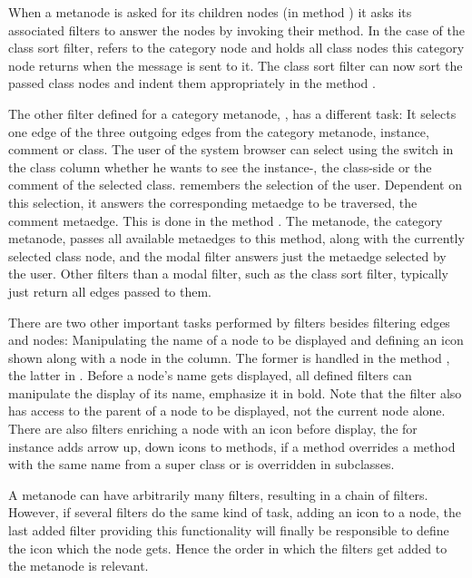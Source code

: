 \documentclass[a4paper,10pt,twoside]{book}
\begin{document}
When a metanode is asked for its children nodes (in method ) it asks its associated filters to answer the nodes by invoking their  method. In the case of the class sort filter,  refers to the category node and  holds all class nodes this category node returns when the message  is sent to it. The class sort filter can now sort the passed class nodes and indent them appropriately in the method .

The other filter defined for a category metanode, , has a different task: It selects one edge of the three outgoing edges from the category metanode, \ie instance, comment or class.  The user of the system browser can select using the switch in the class column whether he wants to see the instance-, the class-side or the comment of the selected class.  remembers the selection of the user. Dependent on this selection, it answers the corresponding metaedge to be traversed, \eg the comment metaedge. This is done in the method . The metanode, \ie the category metanode, passes all available metaedges to this method, along with the currently selected class node, and the modal filter answers just the metaedge selected by the user. Other filters than a modal filter, such as the class sort filter, typically just return all edges passed to them.

There are two other important tasks performed by filters besides filtering edges and nodes: Manipulating the name of a node to be displayed and defining an icon shown along with a node in the column. The former is handled in the method , the latter in . Before a node's name gets displayed, all defined filters can manipulate the display of its name, \eg emphasize it in bold. Note that the filter also has access to the parent of a node to be displayed, not the current node alone. There are also filters enriching a node with an icon before display, the  for instance adds arrow up, down icons to methods, if a method overrides a method with the same name from a super class or is overridden in subclasses.

A metanode can have arbitrarily many filters, resulting in a chain of filters. However, if several filters do the same kind of task, \eg adding an icon to a node, the last added filter providing this functionality will finally be responsible to define the icon which the node gets. Hence the order in which the filters get added to the metanode is relevant. 
\end{document}
